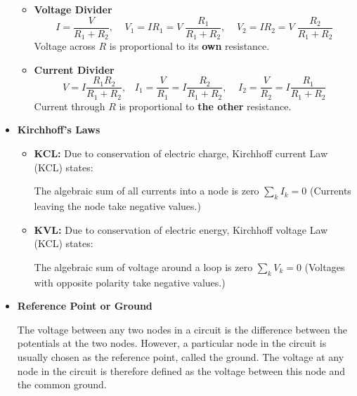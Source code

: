 \begin{itemize}
  
      \begin{itemize}
      \item {\bf Voltage Divider}
	\[ I=\frac{V}{R_1+R_2},\;\;\;\;V_1=IR_1=V\;\frac{R_1}{R_1+R_2},\;\;\;\;
	V_2=IR_2=V\;\frac{R_2}{R_1+R_2} \]
	Voltage across $R$ is proportional to its {\bf own} resistance.
      \item {\bf Current Divider}
	\[ V=I\frac{R_1R_2}{R_1+R_2},\;\;\;I_1=\frac{V}{R_1}=I\frac{R_2}{R_1+R_2},
	\;\;\;\;I_2=\frac{V}{R_2}=I\frac{R_1}{R_1+R_2}  \]
	Current through $R$ is proportional to {\bf the other} resistance.
      \end{itemize}
      
    \item {\bf Kirchhoff's Laws}
      
      
      \begin{itemize} 
      \item {\bf KCL:} Due to conservation of electric charge, Kirchhoff 
	current Law (KCL) states:
	
	The algebraic sum of all currents into a node is zero $\sum_k I_k =0$
	(Currents leaving the node take negative values.)
      \item {\bf KVL:} Due to conservation of electric energy, Kirchhoff 
	voltage Law (KCL) states:

	The algebraic sum of voltage around a loop is zero $\sum_k V_k =0$
	(Voltages with opposite polarity take negative values.)

      \end{itemize}

    \item {\bf Reference Point or Ground}

      The voltage between any two nodes in a circuit is the difference between
      the potentials at the two nodes. However, a particular node in the
      circuit is usually chosen as the reference point, called the ground.
      The voltage at any node in the circuit is therefore defined as the 
      voltage between this node and the common ground.
      
\end{itemize}




	

	

